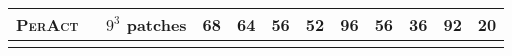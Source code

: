 \documentclass{article}
\newcommand{\model}{\textsc{PerAct}}
\begin{document}
\begin{table}[!b]
\begin{tabular}{lccccccccc}
\rowcolor[rgb]{1.0,1.0,0.90} \model~ $\phantom{0.}9^3$ patches   &  68                                                    & 64                                                    & 56                                                         & 52                                                       & 96                                                  & 56                                                      & 36                                                  & 92                                                   & 20                                                     \\[2pt] 
\hline
                      &                                                                           &                                                                           &                                                                                &                                                                              &                                                                         &                                                                             &                                                                         &                                                                          &                                                                            \\

\end{tabular}
\end{table}
\end{document}
